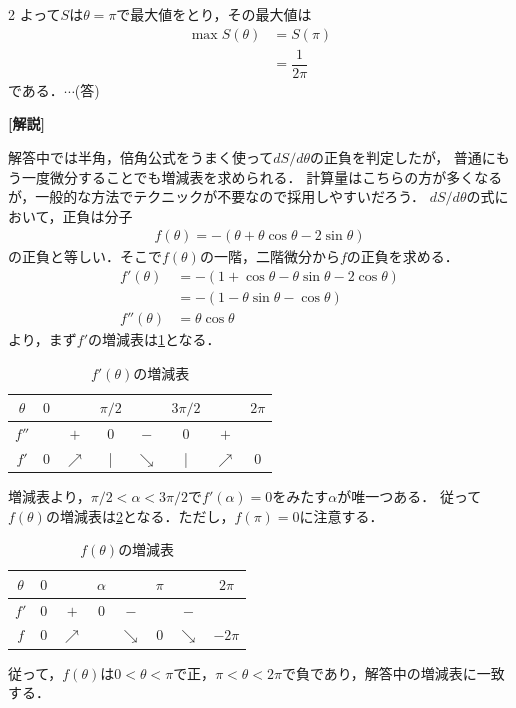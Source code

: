 \documentclass[../../main.tex]{subfiles}
\begin{document}
\begin{multicols}{2}
  よって$S$は$\theta=\pi$で最大値をとり，その最大値は
  \begin{align}
    \max S(\theta)
    & = S(\pi)      \\
    & = \dfrac{1}{2\pi}
  \end{align}
  である．$\cdots$(答)

  {\bf [解説]}

  解答中では半角，倍角公式をうまく使って$dS/d\theta$の正負を判定したが，
  普通にもう一度微分することでも増減表を求められる．
  計算量はこちらの方が多くなるが，一般的な方法でテクニックが不要なので採用しやすいだろう．
  $dS/d\theta$の式において，正負は分子
  \begin{align}
    f(\theta) = -(\theta + \theta\cos\theta - 2\sin\theta)
  \end{align}
  の正負と等しい．そこで$f(\theta)$の一階，二階微分から$f$の正負を求める．
  \begin{align}
    f'(\theta)
    & = -(1+\cos\theta - \theta\sin\theta - 2\cos\theta) \\
    & = -(1 - \theta\sin\theta - \cos\theta)             \\
    f''(\theta)
    & = \theta\cos\theta
  \end{align}
  より，まず$f'$の増減表は\cref{1994-5:table:2}となる．

  \begin{table}[H]
    \centering
    \caption{$f'(\theta)$の増減表}
    \label{1994-5:table:2}
    \begin{tabular}{|c||c|c|c|c|c|c|c|}
      \hline
      $\theta$ & $0$ &            & $\pi/2$ &            & $3\pi/2$ &            & $2\pi$ \\
      \hline
      $f''$    &     & $+$        & $0$     & $-$        & $0$      & $+$        &        \\
      \hline
      $f'$     & $0$ & $\nearrow$ & |       & $\searrow$ & |        & $\nearrow$ & $0$    \\
      \hline
    \end{tabular}
  \end{table}

  増減表より，$\pi/2 < \alpha < 3\pi/2$で$f'(\alpha)=0$をみたす$\alpha$が唯一つある．
  従って$f(\theta)$の増減表は\cref{1994-5:table:3}となる．ただし，$f(\pi)=0$に注意する．

  \begin{table}[H]
    \centering
    \caption{$f(\theta)$の増減表}
    \label{1994-5:table:3}
    \begin{tabular}{|c||c|c|c|c|c|c|c|}
      \hline
      $\theta$ & $0$ &            & $\alpha$ &            & $\pi$ &            & $2\pi$  \\
      \hline
      $f'$     & $0$ & $+$        & $0$      & $-$        &       & $-$        &         \\
      \hline
      $f$      & $0$ & $\nearrow$ &          & $\searrow$ & $0$   & $\searrow$ & $-2\pi$ \\
      \hline
    \end{tabular}
  \end{table}

  従って，$f(\theta)$は$0<\theta<\pi$で正，$\pi<\theta<2\pi$で負であり，解答中の増減表に一致する．

  \newpage
\end{multicols}
\end{document}
